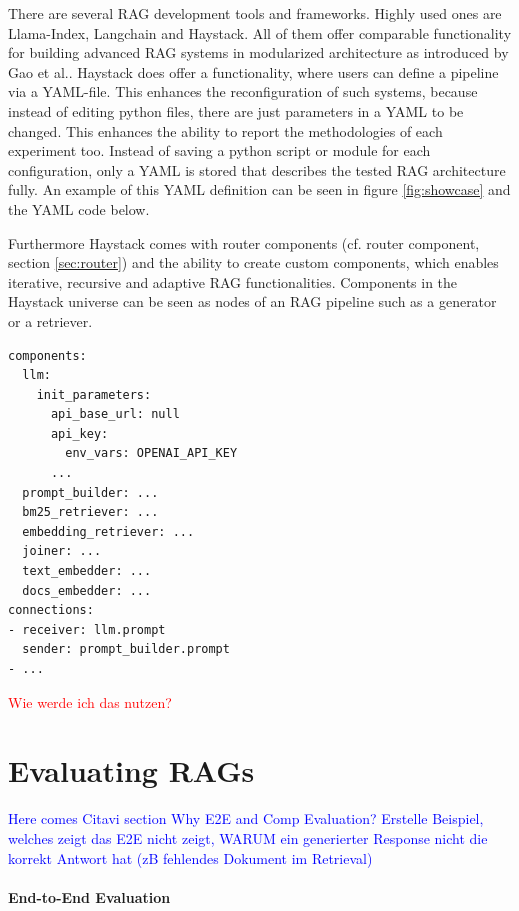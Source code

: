 There are several RAG development tools and frameworks. Highly used ones are Llama-Index\cite{Liu_LlamaIndex_2022}, Langchain\cite{Chase_LangChain_2022} and Haystack\cite{Pietsch_Haystack_the_end-to-end_2019}. All of them offer comparable functionality for building advanced RAG systems in modularized architecture as introduced by Gao et al.\cite{Gao.18.12.2023}. Haystack does offer a functionality, where users can define a pipeline via a YAML-file. This enhances the reconfiguration of such systems, because instead of editing python files, there are just parameters in a YAML to be changed. This enhances the ability to report the methodologies of each experiment too. Instead of saving a python script or module for each configuration, only a YAML is stored that describes the tested RAG architecture fully. An example of this YAML definition can be seen in figure \ref{fig:showcase} and the YAML code below.

Furthermore Haystack comes with router components (cf. router component, section \ref{sec:router}) and the ability to create custom components, which enables iterative, recursive and adaptive RAG functionalities. Components in the Haystack universe can be seen as nodes of an RAG pipeline such as a generator or a retriever. 

\newpage
\begin{verbatim}
components:
  llm:
    init_parameters:
      api_base_url: null
      api_key:
        env_vars: OPENAI_API_KEY
      ...
  prompt_builder: ...
  bm25_retriever: ...
  embedding_retriever: ...
  joiner: ...
  text_embedder: ...
  docs_embedder: ...
connections:
- receiver: llm.prompt
  sender: prompt_builder.prompt
- ...
\end{verbatim}

\textcolor{red}{Wie werde ich das nutzen?}

\section{Evaluating RAGs}

\textcolor{blue}{Here comes Citavi section Why E2E and Comp Evaluation? Erstelle Beispiel, welches zeigt das E2E nicht zeigt, WARUM ein generierter Response nicht die korrekt Antwort hat (zB fehlendes Dokument im Retrieval)}

\paragraph{End-to-End Evaluation}

